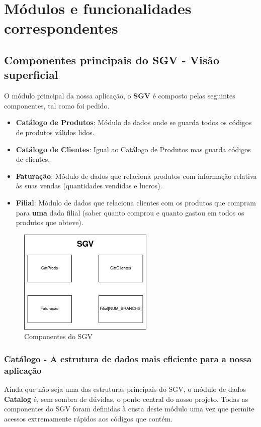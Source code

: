 \documentclass[11pt]{article}
\begin{document}
\section{Módulos e funcionalidades correspondentes}

\subsection{Componentes principais do SGV - Visão superficial}
O módulo principal da nossa aplicação, o \textbf{SGV} é composto pelas seguintes componentes, tal como foi pedido.

\begin{itemize}
    \item \textbf{Catálogo de Produtos}: Módulo de dados onde se guarda todos os códigos de produtos válidos lidos.
    \item \textbf{Catálogo de Clientes}: Igual ao Catálogo de Produtos mas guarda códigos de clientes.
    \item \textbf{Faturação}: Módulo de dados que relaciona produtos com informação relativa às suas vendas (quantidades vendidas e lucros).
    \item \textbf{Filial}: Módulo de dados que relaciona clientes com os produtos que compram para \textbf{uma} dada filial (saber quanto comprou e quanto gastou em todos os produtos que obteve).
\end{itemize}

\vspace{1cm}
\begin{figure}[h]
    \centering
    \includegraphics[width=\textwidth,height=5cm]{images/sgv.png}
    \caption{Componentes do SGV}
\end{figure}

\newpage
\subsubsection{Catálogo - A estrutura de dados mais eficiente para a nossa aplicação}
Ainda que não seja uma das estruturas principais do SGV, o módulo de dados \textbf{Catalog} é, sem sombra de dúvidas, o ponto central do nosso projeto. Todas as componentes do SGV foram definidas à custa deste módulo uma vez que permite acessos extremamente rápidos aos códigos que contém.
\end{document}
